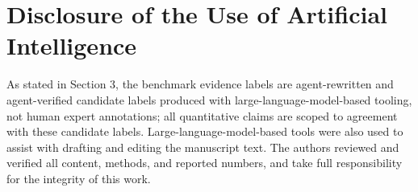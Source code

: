 \documentclass{ieeeaccess}
\begin{document}
\section*{Disclosure of the Use of Artificial Intelligence}

As stated in Section 3, the benchmark evidence labels are agent-rewritten and agent-verified candidate labels produced with large-language-model-based tooling, not human expert annotations; all quantitative claims are scoped to agreement with these candidate labels. Large-language-model-based tools were also used to assist with drafting and editing the manuscript text. The authors reviewed and verified all content, methods, and reported numbers, and take full responsibility for the integrity of this work.




\EOD
\end{document}
